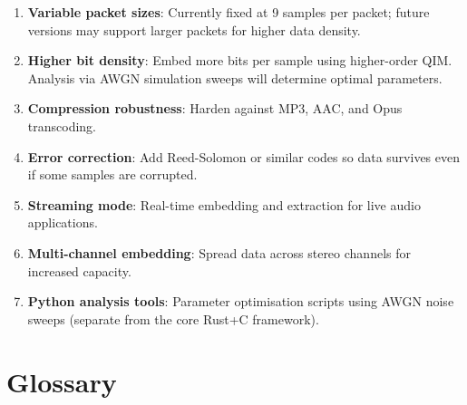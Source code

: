\documentclass[11pt,a4paper]{article}
\begin{document}
\begin{enumerate}
    \item \textbf{Variable packet sizes}: Currently fixed at 9 samples
          per packet; future versions may support larger packets for
          higher data density.

    \item \textbf{Higher bit density}: Embed more bits per sample using
          higher-order QIM.  Analysis via AWGN simulation sweeps will
          determine optimal parameters.

    \item \textbf{Compression robustness}: Harden against MP3, AAC,
          and Opus transcoding.

    \item \textbf{Error correction}: Add Reed-Solomon or similar codes
          so data survives even if some samples are corrupted.

    \item \textbf{Streaming mode}: Real-time embedding and extraction
          for live audio applications.

    \item \textbf{Multi-channel embedding}: Spread data across stereo
          channels for increased capacity.

    \item \textbf{Python analysis tools}: Parameter optimisation scripts
          using AWGN noise sweeps (separate from the core Rust+C framework).
\end{enumerate}


\section{Glossary}
\end{document}
